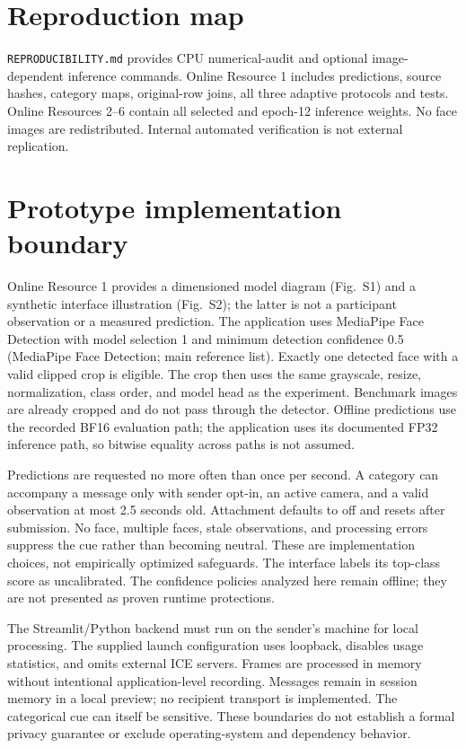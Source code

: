 \documentclass[10pt]{article}
\begin{document}
\section*{Reproduction map}
\texttt{REPRODUCIBILITY.md} provides CPU numerical-audit and optional image-dependent inference commands. Online Resource 1 includes predictions, source hashes, category maps, original-row joins, all three adaptive protocols and tests. Online Resources 2--6 contain all selected and epoch-12 inference weights. No face images are redistributed. Internal automated verification is not external replication.
\clearpage
\section*{Prototype implementation boundary}

Online Resource 1 provides a dimensioned model diagram (Fig.~S1) and a synthetic interface illustration (Fig.~S2); the latter is not a participant observation or a measured prediction.
The application uses MediaPipe Face Detection with model selection 1 and minimum detection confidence 0.5 (MediaPipe Face Detection; main reference list). Exactly one detected face with a valid clipped crop is eligible. The crop then uses the same grayscale, resize, normalization, class order, and model head as the experiment. Benchmark images are already cropped and do not pass through the detector. Offline predictions use the recorded BF16 evaluation path; the application uses its documented FP32 inference path, so bitwise equality across paths is not assumed.

Predictions are requested no more often than once per second. A category can accompany a message only with sender opt-in, an active camera, and a valid observation at most 2.5 seconds old. Attachment defaults to off and resets after submission. No face, multiple faces, stale observations, and processing errors suppress the cue rather than becoming neutral. These are implementation choices, not empirically optimized safeguards. The interface labels its top-class score as uncalibrated. The confidence policies analyzed here remain offline; they are not presented as proven runtime protections.

The Streamlit/Python backend must run on the sender's machine for local processing. The supplied launch configuration uses loopback, disables usage statistics, and omits external ICE servers. Frames are processed in memory without intentional application-level recording. Messages remain in session memory in a local preview; no recipient transport is implemented. The categorical cue can itself be sensitive. These boundaries do not establish a formal privacy guarantee or exclude operating-system and dependency behavior.
\end{document}
